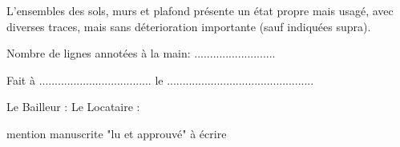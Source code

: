 \documentclass[a4paper,11pt]{article}
\begin{document}
\vspace{0.25cm}

L'ensembles des sols, murs et plafond présente un état propre mais usagé, avec diverses traces, mais sans déterioration importante (sauf indiquées supra).

\vspace{0.25cm}

Nombre de lignes annotées à la main: ..........................

\vspace{0.25cm}

Fait à .................................... le ...............................................

\vspace{0.25cm}

Le Bailleur : \hspace{3cm}Le Locataire : 

\hspace{5.2cm}mention manuscrite "lu et approuvé" à écrire


\newpage{}
\end{document}
